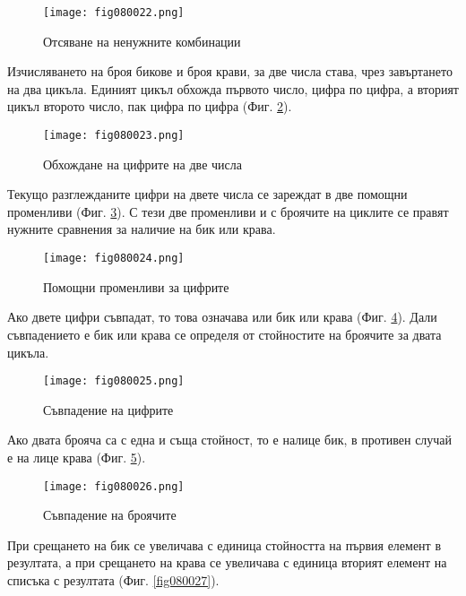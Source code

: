 \begin{figure}[H]
  \centering
  \texttt{[image: fig080022.png]}
  \caption{Отсяване на ненужните комбинации}
\label{fig080022}
\end{figure}

Изчисляването на броя бикове и броя крави, за две числа става, чрез завъртането на два цикъла. Единият цикъл обхожда първото число, цифра по цифра, а вторият цикъл второто число, пак цифра по цифра (Фиг. \ref{fig080023}).

\begin{figure}[H]
  \centering
  \texttt{[image: fig080023.png]}
  \caption{Обхождане на цифрите на две числа}
\label{fig080023}
\end{figure}

Текущо разглежданите цифри на двете числа се зареждат в две помощни променливи (Фиг. \ref{fig080024}). С тези две променливи и с броячите на циклите се правят нужните сравнения за наличие на бик или крава. 

\begin{figure}[H]
  \centering
  \texttt{[image: fig080024.png]}
  \caption{Помощни променливи за цифрите}
\label{fig080024}
\end{figure}

Ако двете цифри съвпадат, то това означава или бик или крава (Фиг. \ref{fig080025}). Дали съвпадението е бик или крава се определя от стойностите на броячите за двата цикъла.

\begin{figure}[H]
  \centering
  \texttt{[image: fig080025.png]}
  \caption{Съвпадение на цифрите}
\label{fig080025}
\end{figure}

Ако двата брояча са с една и съща стойност, то е налице бик, в противен случай е на лице крава (Фиг. \ref{fig080026}).

\begin{figure}[H]
  \centering
  \texttt{[image: fig080026.png]}
  \caption{Съвпадение на броячите}
\label{fig080026}
\end{figure}

При срещането на бик се увеличава с единица стойността на първия елемент в резултата, а при срещането на крава се увеличава с единица вторият елемент на списъка с резултата (Фиг. \ref{fig080027}).

